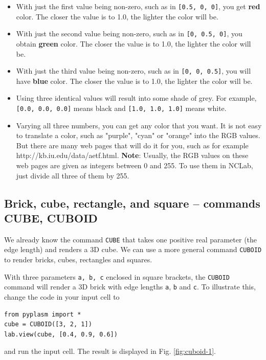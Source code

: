 \documentclass{article}
\begin{document}
\begin{itemize}
\item With just the first value being non-zero, such as in {\tt [0.5, 0, 0]},
      you get {\bf red} color. The closer the value is to 1.0, the lighter the color
      will be.
\item With just the second value being non-zero, such as in {\tt [0, 0.5, 0]},
      you obtain {\bf green} color. The closer the  value is to 1.0, the lighter the color
      will be.
\item With just the third value being non-zero, such as in {\tt [0, 0, 0.5]},
      you will have {\bf blue} color. The closer the  value is to 1.0, the lighter the color
      will be.
\item Using three identical values will result into some shade of grey. For 
      example, {\tt [0.0, 0.0, 0.0]}
      means black and {\tt [1.0, 1.0, 1.0]} means white.
\item Varying all three numbers, you can get any color that you want. It is not 
      easy to translate a color, such as "purple", "cyan" or "orange" into the RGB
      values. But there are many web pages that will do it for you, such as for
      example http://kb.iu.edu/data/aetf.html. {\bf Note}: Usually,
      the RGB values on these web pages are given as integers between 0 and 255. To use them in NCLab,
      just divide all three of them by 255.
\end{itemize}

 
\subsection{Brick, cube, rectangle, and square -- commands CUBE, CUBOID}

We already know the command {\tt CUBE} that takes one positive real
parameter (the edge length) and renders a 3D cube. We can use a more general command {\tt CUBOID}
to render bricks, cubes, rectangles and squares.
   
With three parameters {\tt a, b, c} enclosed in square brackets, the {\tt CUBOID} command will 
render a 3D brick with edge lengths {\tt a}, {\tt b} and {\tt c}. To illustrate this, 
change the code in your input cell to  

\begin{verbatim}
from pyplasm import *
cube = CUBOID([3, 2, 1])
lab.view(cube, [0.4, 0.9, 0.6])
\end{verbatim}
and run the input cell. The result is displayed in Fig. \ref{fig:cuboid-1}.
\end{document}
